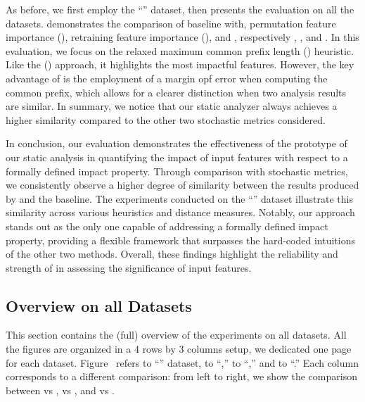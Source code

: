 As before, we first employ the ``\diabetes{}'' dataset, then  presents the evaluation on all the datasets.
 demonstrates the comparison of baseline with, permutation feature importance (\pfi), retraining feature importance (\rfe), and \impatto, respectively , , and .
In this evaluation, we focus on the relaxed maximum common prefix length (\rmcpl) heuristic.
Like the (\mcpl) approach, it highlights the most impactful features.
However, the key advantage of \rmcpl{} is the employment of a margin opf error when computing the common prefix, which allows for a clearer distinction when two analysis results are similar.
In summary, we notice that our static analyzer \impatto{} always achieves a higher similarity compared to the other two stochastic metrics considered.


In conclusion, our evaluation demonstrates the effectiveness of the prototype of our static analysis in quantifying the impact of input features with respect to a formally defined impact property.
Through comparison with stochastic metrics, we consistently observe a higher degree of similarity between the results produced by \impatto{} and the baseline.
The experiments conducted on the ``\diabetes{}'' dataset illustrate this similarity across various heuristics and distance measures.
Notably, our approach stands out as the only one capable of addressing a formally defined impact property, providing a flexible framework that surpasses the hard-coded intuitions of the other two methods.
Overall, these findings highlight the reliability and strength of \impatto{} in assessing the significance of input features.

\subsection{Overview on all Datasets}

This section contains the (full) overview of the experiments on all datasets.
All the figures are organized in a 4 rows by 3 columns setup, we dedicated one page for each dataset.
Figure~ refers to ``\diabetes{}'' dataset,  to ``\wine,''  to ``\rain,'' and  to ``\princess.''
Each column corresponds to a different comparison: from left to right, we show the comparison between \impatto{} vs \pfi, \impatto{} vs \rfe, and \pfi{} vs \rfe.

